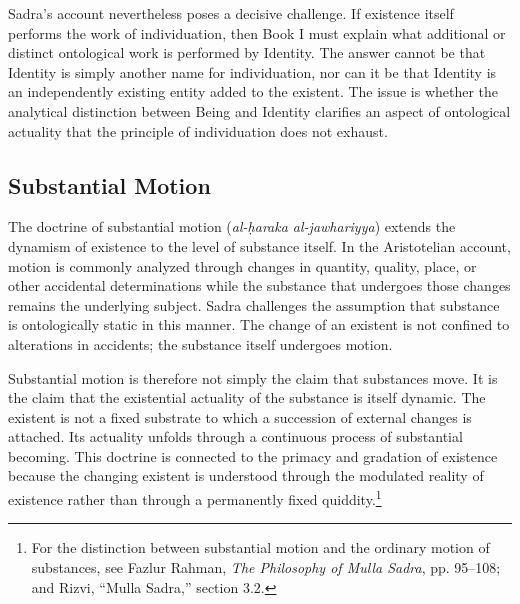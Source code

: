 Sadra's account nevertheless
poses a decisive challenge.
If existence itself performs
the work of individuation,
then Book I must explain
what additional or distinct
ontological work is performed
by Identity. The answer cannot
be that Identity is simply
another name for individuation,
nor can it be that Identity
is an independently existing
entity added to the existent.
The issue is whether the
analytical distinction between
Being and Identity clarifies
an aspect of ontological
actuality that the principle
of individuation does not
exhaust.




\subsection{Substantial Motion}
\label{subsec:ch08_s17_ss09}

\label{para:VS.B01.P01.C08.S17.SS09.P001}

The doctrine of substantial motion
(\textit{al-ḥaraka al-jawhariyya})
extends the dynamism of existence
to the level of substance itself.
In the Aristotelian account,
motion is commonly analyzed
through changes in quantity,
quality, place, or other
accidental determinations while
the substance that undergoes
those changes remains the
underlying subject. Sadra
challenges the assumption that
substance is ontologically
static in this manner. The
change of an existent is
not confined to alterations
in accidents; the substance
itself undergoes motion.

\label{para:VS.B01.P01.C08.S17.SS09.P002}

Substantial motion is therefore
not simply the claim that
substances move. It is the
claim that the existential
actuality of the substance
is itself dynamic. The existent
is not a fixed substrate
to which a succession of
external changes is attached.
Its actuality unfolds through
a continuous process of
substantial becoming. This
doctrine is connected to
the primacy and gradation
of existence because the
changing existent is understood
through the modulated reality
of existence rather than
through a permanently fixed
quiddity.\footnote{For the
distinction between substantial
motion and the ordinary motion
of substances, see Fazlur Rahman,
\textit{The Philosophy of Mulla
Sadra}, pp. 95--108; and Rizvi,
``Mulla Sadra,'' section 3.2.}

